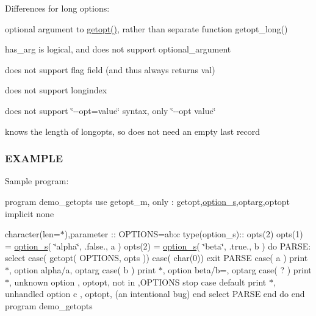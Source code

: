 Differences for long options\+:
\begin{DoxyItemize}
\item optional argument to \hyperlink{namespacem__getopt_a00e4c1d7d61539e0bdf63a6ee13284d2}{getopt()}, rather than separate function getopt\+\_\+long()
\item has\+\_\+arg is logical, and does not support optional\+\_\+argument
\item does not support flag field (and thus always returns val)
\item does not support longindex
\item does not support \char`\"{}-\/-\/opt=value\char`\"{} syntax, only \char`\"{}-\/-\/opt value\char`\"{}
\item knows the length of longopts, so does not need an empty last record
\end{DoxyItemize}

\subsubsection*{E\+X\+A\+M\+P\+LE}

Sample program\+:

program demo\+\_\+getopts use getopt\+\_\+m, only \+: getopt,\hyperlink{structm__getopt_1_1option__s}{option\+\_\+s},optarg,optopt implicit none

character(len=$\ast$),parameter \+:\+: O\+P\+T\+I\+O\+NS=\textquotesingle{}ab\+:c\textquotesingle{} type(option\+\_\+s)\+:\+: opts(2) opts(1) = \hyperlink{structm__getopt_1_1option__s}{option\+\_\+s}( \char`\"{}alpha\char`\"{}, .false., \textquotesingle{}a\textquotesingle{} ) opts(2) = \hyperlink{structm__getopt_1_1option__s}{option\+\_\+s}( \char`\"{}beta\char`\"{}, .true., \textquotesingle{}b\textquotesingle{} ) do P\+A\+R\+SE\+: select case( getopt( O\+P\+T\+I\+O\+N\+S, opts )) case( char(0)) exit P\+A\+R\+SE case( \textquotesingle{}a\textquotesingle{} ) print $\ast$, \textquotesingle{}option alpha/a\textquotesingle{}, optarg case( \textquotesingle{}b\textquotesingle{} ) print $\ast$, \textquotesingle{}option beta/b=\textquotesingle{}, optarg case( \textquotesingle{}?\textquotesingle{} ) print $\ast$, \textquotesingle{}unknown option \textquotesingle{}, optopt,\textquotesingle{} not in \textquotesingle{},O\+P\+T\+I\+O\+NS stop case default print $\ast$, \textquotesingle{}unhandled option c \textquotesingle{}, optopt, \textquotesingle{} (an intentional bug)\textquotesingle{} end select P\+A\+R\+SE end do end program demo\+\_\+getopts

